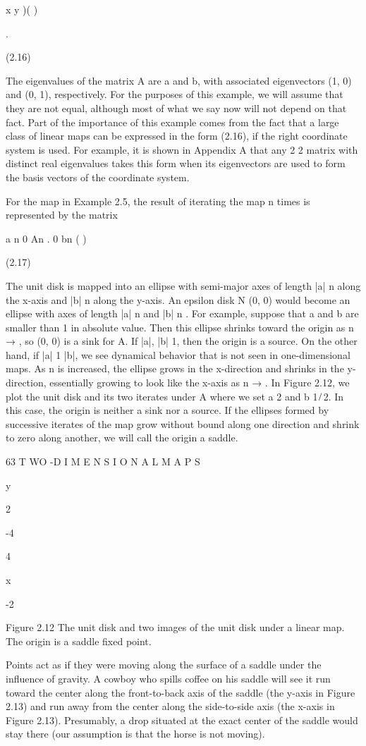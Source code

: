 \documentclass[12pt]{article}
\begin{document}
x y )( )

.

(2.16)

The eigenvalues of the matrix A are a and b, with associated eigenvectors (1, 0) and (0, 1), respectively. For the purposes of this 
example, we will assume that they are not equal, although most of what we say now will not depend on that fact. Part of the 
importance of this example comes from the fact that a large class of linear maps can be expressed in the form (2.16), if the right 
coordinate system is used. For example, it is shown in Appendix A that any 2 2 matrix with distinct real eigenvalues takes this form 
when its eigenvectors are used to form the basis vectors of the coordinate system.

For the map in Example 2.5, the result of iterating the map n times is represented by the matrix

a n 0 An  . 0 bn  ( )

(2.17)

The unit disk is mapped into an ellipse with semi-major axes of length |a| n along the x-axis and |b| n along the y-axis. An epsilon 
disk N  (0, 0) would become an ellipse with axes of length |a| n and |b| n . For example, suppose that a and b are smaller than 1 in 
absolute value. Then this ellipse shrinks toward the origin as n → , so (0, 0) is a sink for A. If |a|, |b|  1, then the origin is a 
source. On the other hand, if |a|  1  |b|, we see dynamical behavior that is not seen in one-dimensional maps. As n is increased, the 
ellipse grows in the x-direction and shrinks in the y-direction, essentially growing to look like the x-axis as n → . In Figure 
2.12, we plot the unit disk and its two iterates under A where we set a  2 and b  1 ̸ 2. In this case, the origin is neither a sink 
nor a source. If the ellipses formed by successive iterates of the map grow without bound along one direction and shrink to zero 
along another, we will call the origin a saddle.

63 T WO -D I M E N S I O N A L M A P S

y

2

-4

4

x

-2

Figure 2.12 The unit disk and two images of the unit disk under a linear map. The origin is a saddle ﬁxed point.

Points act as if they were moving along the surface of a saddle under the inﬂuence of gravity. A cowboy who spills coffee on his 
saddle will see it run toward the center along the front-to-back axis of the saddle (the y-axis in Figure 2.13) and run away from the 
center along the side-to-side axis (the x-axis in Figure 2.13). Presumably, a drop situated at the exact center of the saddle would 
stay there (our assumption is that the horse is not moving).
\end{document}
